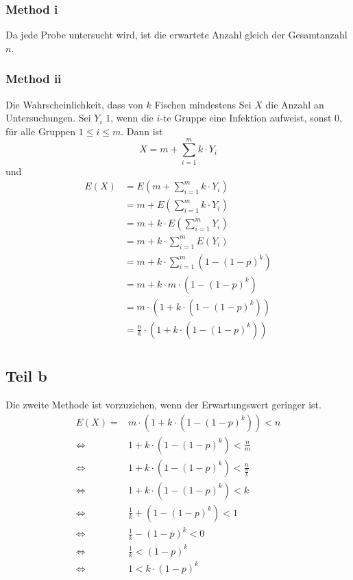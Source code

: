 \documentclass[10pt,a4paper]{article}
\begin{document}
\subsubsection{Method i}
Da jede Probe untersucht wird, ist die erwartete Anzahl gleich der Gesamtanzahl $n$.

\subsubsection{Method ii}
Die Wahrscheinlichkeit, dass von $k$ Fischen mindestens
Sei $X$ die Anzahl an Untersuchungen.
Sei $Y_{i}$ $1$, wenn die $i$-te Gruppe eine Infektion aufweist, sonst $0$, für alle Gruppen $1 \le i \le m$.
Dann ist
\begin{equation}
  X = m + \sum_{i = 1}^{m} k \cdot Y_{i}
\end{equation}
und
\begin{align*}
  E(X) & = E(m + \sum_{i = 1}^{m} k \cdot Y_{i})\\
  & = m + E(\sum_{i = 1}^{m} k \cdot Y_{i})\\
  & = m + k \cdot E(\sum_{i = 1}^{m} Y_{i})\\
  & = m + k \cdot \sum_{i = 1}^{m} E(Y_{i})\\
  & = m + k \cdot \sum_{i = 1}^{m} \left( 1 - (1 - p)^{k} \right)\\
  & = m + k \cdot m \cdot \left( 1 - (1 - p)^{k} \right)\\
  & = m \cdot \left( 1 + k \cdot \left( 1 - (1 - p)^{k} \right) \right)\\
  & = \frac{n}{k} \cdot \left( 1 + k \cdot \left( 1 - (1 - p)^{k} \right) \right)\\
\end{align*}

\subsection{Teil b}
Die zweite Methode ist vorzuziehen, wenn der Erwartungswert geringer ist.
\begin{align*}
  E(X) = & m \cdot \left( 1 + k \cdot \left( 1 - (1 - p)^{k} \right) \right) < n\\
  \Leftrightarrow & 1 + k \cdot \left( 1 - (1 - p)^{k} \right) < \frac{n}{m}\\
  \Leftrightarrow & 1 + k \cdot \left( 1 - (1 - p)^{k} \right) < \frac{n}{\frac{n}{k}}\\
  \Leftrightarrow & 1 + k \cdot \left( 1 - (1 - p)^{k} \right) < k\\
  \Leftrightarrow & \frac{1}{k} + \left( 1 - (1 - p)^{k} \right) < 1\\
  \Leftrightarrow & \frac{1}{k} - (1 - p)^{k} < 0\\
  \Leftrightarrow & \frac{1}{k} < (1 - p)^{k}\\
  \Leftrightarrow & 1 < k \cdot (1 - p)^{k}\\
\end{align*}
\end{document}

